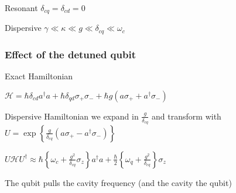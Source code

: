 \documentclass{beamer}
\begin{document}
\begin{frame}

    \begin{block}{Resonant}
        $
        \delta_{cq} = \delta_{cd}=0
        $
    \end{block}

\end{frame}
\begin{frame}

    

\end{frame}
\begin{frame}

    \begin{block}{Dispersive}
        $
        \gamma \ll \kappa \ll g \ll \delta_{cq} \ll \omega_c
        $
    \end{block}

\end{frame}
\begin{frame}

    \frametitle{Effect of the detuned qubit}

    \begin{block}{Exact Hamiltonian}

        $
        \mathscr{H} = \hbar \delta_{cd} a^\dagger a + 
        \hbar \delta_{qd}\sigma_+ \sigma_- + 
        \hbar g ( a \sigma_+ + a^\dagger \sigma_- ) 
        $

    \end{block}
    \begin{block}{Dispersive Hamiltonian}
        we expand in $\frac{g}{\delta_{cq}}$ and transform with 
        $
        U = \exp \left \{\frac{g}{\delta_{cq}} 
            ( a \sigma_+ - a ^ \dagger \sigma_- ) \right \}
        $

        $ 
        U\mathscr{H}U ^ \dagger \approx \hbar 
        \left\{ \omega_c + \frac{g^2}{\delta_{cq}} \sigma_z \right\}
        a ^ \dagger a + 
        \frac{\hbar}{2} \left\{ \omega_q + \frac{g^2}{\delta_{cq}} \right\}
        \sigma_z 
        $
    
    The qubit pulls the cavity frequency (and the cavity the qubit)

    \end{block}

\end{frame}
\end{document}
